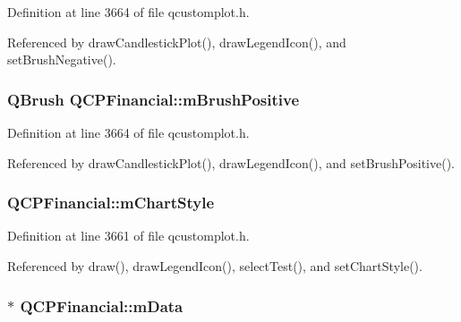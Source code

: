 Definition at line 3664 of file qcustomplot.\+h.



Referenced by draw\+Candlestick\+Plot(), draw\+Legend\+Icon(), and set\+Brush\+Negative().

\hypertarget{class_q_c_p_financial_ab7e6eed16260a2f88ca6bd940dffea79}{}
\subsubsection[{m\+Brush\+Positive}]{\setlength{\rightskip}{0pt plus 5cm}Q\+Brush Q\+C\+P\+Financial\+::m\+Brush\+Positive\hspace{0.3cm}{\ttfamily [protected]}}\label{class_q_c_p_financial_ab7e6eed16260a2f88ca6bd940dffea79}


Definition at line 3664 of file qcustomplot.\+h.



Referenced by draw\+Candlestick\+Plot(), draw\+Legend\+Icon(), and set\+Brush\+Positive().

\hypertarget{class_q_c_p_financial_ab65c2ce8d6354451870bb44b894c1e92}{}
\subsubsection[{m\+Chart\+Style}]{ Q\+C\+P\+Financial\+::m\+Chart\+Style\hspace{0.3cm}{\ttfamily [protected]}}\label{class_q_c_p_financial_ab65c2ce8d6354451870bb44b894c1e92}


Definition at line 3661 of file qcustomplot.\+h.



Referenced by draw(), draw\+Legend\+Icon(), select\+Test(), and set\+Chart\+Style().

\hypertarget{class_q_c_p_financial_a475f63587ca1077d8c30aaf2b71ae026}{}
\subsubsection[{m\+Data}]{$\ast$ Q\+C\+P\+Financial\+::m\+Data\hspace{0.3cm}{\ttfamily [protected]}}\label{class_q_c_p_financial_a475f63587ca1077d8c30aaf2b71ae026}



